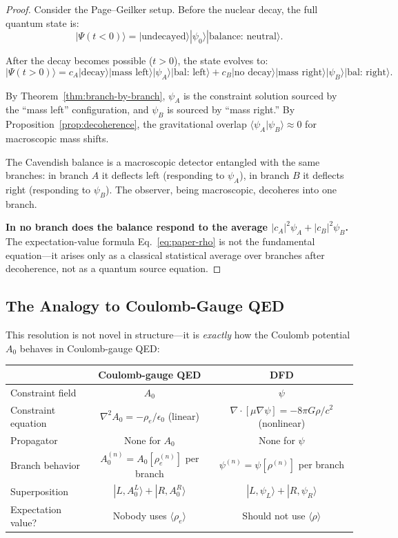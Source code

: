 \documentclass[11pt,a4paper]{article}
\begin{document}
\begin{proof}
Consider the Page--Geilker setup. Before the nuclear decay, the full
quantum state is:
\begin{equation}
|\Psi(t < 0)\rangle = |\text{undecayed}\rangle|\psi_0\rangle
|\text{balance: neutral}\rangle.
\end{equation}

After the decay becomes possible ($t > 0$), the state evolves to:
\begin{equation}
|\Psi(t > 0)\rangle = c_A|\text{decay}\rangle|\text{mass left}\rangle
|\psi_A\rangle|\text{bal: left}\rangle
+ c_B|\text{no decay}\rangle|\text{mass right}\rangle
|\psi_B\rangle|\text{bal: right}\rangle.
\end{equation}

By Theorem~\ref{thm:branch-by-branch}, $\psi_A$ is the constraint solution
sourced by the ``mass left'' configuration, and $\psi_B$ is sourced by
``mass right.'' By Proposition~\ref{prop:decoherence}, the gravitational
overlap $\langle\psi_A|\psi_B\rangle \approx 0$ for macroscopic mass
shifts.

The Cavendish balance is a macroscopic detector entangled with the same
branches: in branch $A$ it deflects left (responding to $\psi_A$), in
branch $B$ it deflects right (responding to $\psi_B$). The observer,
being macroscopic, decoheres into one branch.

\textbf{In no branch does the balance respond to the average
$|c_A|^2\psi_A + |c_B|^2\psi_B$.} The expectation-value formula
Eq.~\eqref{eq:paper-rho} is not the fundamental equation---it arises
only as a classical statistical average over branches after decoherence,
not as a quantum source equation.
\end{proof}

\subsection{The Analogy to Coulomb-Gauge QED}

This resolution is not novel in structure---it is \emph{exactly} how
the Coulomb potential $A_0$ behaves in Coulomb-gauge QED:

\begin{center}
\begin{tabular}{lcc}
\toprule
& \textbf{Coulomb-gauge QED} & \textbf{DFD} \\
\midrule
Constraint field & $A_0$ & $\psi$ \\
Constraint equation & $\nabla^2 A_0 = -\rho_e/\epsilon_0$ (linear)
& $\nabla\cdot[\mu\nabla\psi] = -8\pi G\rho/c^2$ (nonlinear) \\
Propagator & None for $A_0$ & None for $\psi$ \\
Branch behavior & $A_0^{(n)} = A_0[\rho_e^{(n)}]$ per branch
& $\psi^{(n)} = \psi[\rho^{(n)}]$ per branch \\
Superposition & $|L,A_0^L\rangle + |R,A_0^R\rangle$
& $|L,\psi_L\rangle + |R,\psi_R\rangle$ \\
Expectation value? & Nobody uses $\langle\rho_e\rangle$
& Should not use $\langle\rho\rangle$ \\
\bottomrule
\end{tabular}
\end{center}
\end{document}

